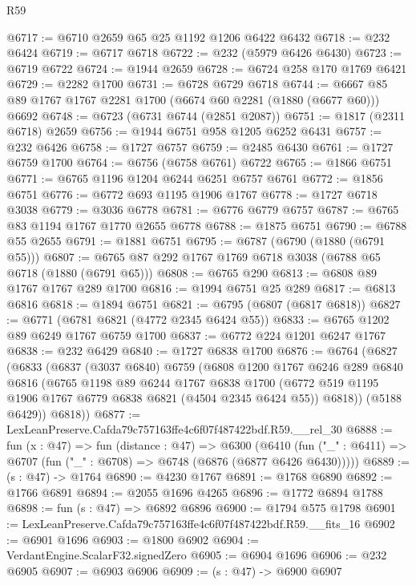 \begin{lexlean}{R59}
\begin{coremodule}
@6717 := @6710 @2659 @65 @25 @1192 @1206 @6422 @6432
@6718 := @232 @6424
@6719 := @6717 @6718
@6722 := @232 (@5979 @6426 @6430)
@6723 := @6719 @6722
@6724 := @1944 @2659
@6728 := @6724 @258 @170 @1769 @6421
@6729 := @2282 @1700
@6731 := @6728 @6729 @6718
@6744 := @6667 @85 @89 @1767 @1767 @2281 @1700 (@6674 @60 @2281 (@1880 (@6677 @60))) @6692
@6748 := @6723 (@6731 @6744 (@2851 @2087))
@6751 := @1817 (@2311 @6718) @2659
@6756 := @1944 @6751 @958 @1205 @6252 @6431
@6757 := @232 @6426
@6758 := @1727 @6757
@6759 := @2485 @6430
@6761 := @1727 @6759 @1700
@6764 := @6756 (@6758 @6761) @6722
@6765 := @1866 @6751
@6771 := @6765 @1196 @1204 @6244 @6251 @6757 @6761
@6772 := @1856 @6751
@6776 := @6772 @693 @1195 @1906 @1767
@6778 := @1727 @6718 @3038
@6779 := @3036 @6778
@6781 := @6776 @6779 @6757
@6787 := @6765 @83 @1194 @1767 @1770 @2655 @6778
@6788 := @1875 @6751
@6790 := @6788 @55 @2655
@6791 := @1881 @6751
@6795 := @6787 (@6790 (@1880 (@6791 @55)))
@6807 := @6765 @87 @292 @1767 @1769 @6718 @3038 (@6788 @65 @6718 (@1880 (@6791 @65)))
@6808 := @6765 @290
@6813 := @6808 @89 @1767 @1767 @289 @1700
@6816 := @1994 @6751 @25 @289
@6817 := @6813 @6816
@6818 := @1894 @6751
@6821 := @6795 (@6807 (@6817 @6818))
@6827 := @6771 (@6781 @6821 (@4772 @2345 @6424 @55))
@6833 := @6765 @1202 @89 @6249 @1767 @6759 @1700
@6837 := @6772 @224 @1201 @6247 @1767
@6838 := @232 @6429
@6840 := @1727 @6838 @1700
@6876 := @6764
    (@6827
      (@6833
        (@6837
          (@3037 @6840)
          @6759
          (@6808
            @1200
            @1767
            @6246
            @289
            @6840
            @6816
            (@6765
              @1198
              @89
              @6244
              @1767
              @6838
              @1700
              (@6772 @519 @1195 @1906 @1767 @6779 @6838 @6821 (@4504 @2345 @6424 @55))
              @6818))
          (@5188 @6429))
        @6818))
@6877 := LexLeanPreserve.Cafda79c757163ffe4c6f07f487422bdf.R59.__rel_30
@6888 := fun (x : @47) =>
  fun (distance : @47) =>
  @6300
    (@6410 (fun ("_" : @6411) => @6707 (fun ("_" : @6708) => @6748 (@6876 (@6877 @6426 @6430)))))
@6889 := (s : @47) -> @1764
@6890 := @4230 @1767
@6891 := @1768 @6890
@6892 := @1766 @6891
@6894 := @2055 @1696 @4265
@6896 := @1772 @6894 @1788
@6898 := fun (s : @47) => @6892 @6896
@6900 := @1794 @575 @1798
@6901 := LexLeanPreserve.Cafda79c757163ffe4c6f07f487422bdf.R59.__fits_16
@6902 := @6901 @1696
@6903 := @1800 @6902
@6904 := VerdantEngine.ScalarF32.signedZero
@6905 := @6904 @1696
@6906 := @232 @6905
@6907 := @6903 @6906
@6909 := (s : @47) -> @6900 @6907

\end{coremodule}
\end{lexlean}

